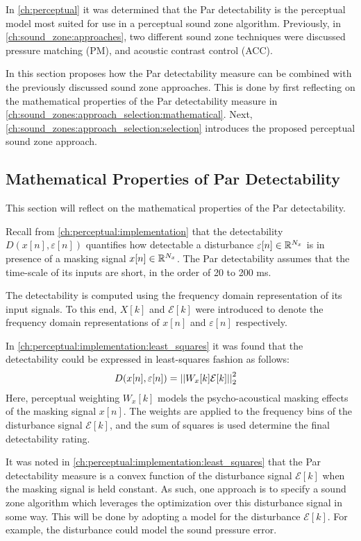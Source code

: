In \autoref{ch:perceptual} it was determined that the Par detectability is the perceptual model most suited for use in a 
perceptual sound zone algorithm.
Previously, in \autoref{ch:sound_zone:approaches}, two different sound zone techniques were discussed 
pressure matching (PM), and acoustic contrast control (ACC). 

In this section proposes how the Par detectability measure can be combined with the previously discussed sound zone approaches.
This is done by first reflecting on the mathematical properties of the Par detectability measure 
in \autoref{ch:sound_zones:approach_selection:mathematical}.
Next, \autoref{ch:sound_zones:approach_selection:selection} introduces the proposed perceptual sound zone approach.

\subsection{Mathematical Properties of Par Detectability}
\label{ch:sound_zones:approach_selection:mathematical}
This section will reflect on the mathematical properties of the Par detectability.

Recall from \autoref{ch:perceptual:implementation} that the detectability $D(x[n],\varepsilon[n])$ quantifies how detectable a disturbance
$\varepsilon[n]\in\mathbb{R}^{N_x}$ is in presence of a masking signal $x[n]\in\mathbb{R}^{N_x}$.
The Par detectability assumes that the time-scale of its inputs are short, in the order of 20 to 200 ms.

The detectability is computed using the frequency domain representation of its input signals.
To this end, $X[k]$ and $\mathcal{E}[k]$ were introduced to denote the frequency domain representations of $x[n]$ and $\varepsilon[n]$ respectively.

In \autoref{ch:perceptual:implementation:least_squares} it was found that the detectability could be expressed in least-squares fashion as follows:
\begin{align}
    D(x[n],\varepsilon[n]) &= \norm[2][2]{W_x[k]\mathcal{E}[k]} 
    \label{eq:perceptual:approach_selection:detectability}
\end{align}
Here, perceptual weighting $W_x[k]$ models the psycho-acoustical masking effects of the masking signal $x[n]$.
The weights are applied to the frequency bins of the disturbance signal $\mathcal{E}[k]$, and the sum of squares is used determine the final detectability rating.

It was noted in \autoref{ch:perceptual:implementation:least_squares} that the Par detectability measure
is a convex function of the disturbance signal $\mathcal{E}[k]$ when the masking signal is held constant. 
As such, one approach is to specify a sound zone algorithm which leverages the optimization over this disturbance signal in some way.
This will be done by adopting a model for the disturbance $\mathcal{E}[k]$.
For example, the disturbance could model the sound pressure error.

